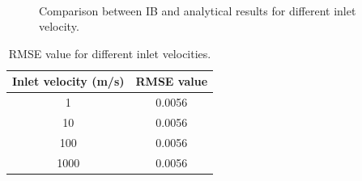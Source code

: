 \begin{figure}[H]
	\centering
	\quad
	\\
	\quad
	\caption{Comparison between IB and analytical results for different inlet velocity.}
	\label{fig:C3_penalizationResultInletVelocity}
\end{figure}

\begin{table}[H]
\centering
\begin{tabular}{c | c}
	Inlet velocity (m/s) & RMSE value \\ \hline \hline
	1 & 0.0056 \\ \hline
	10 & 0.0056 \\ \hline
	100 & 0.0056 \\ \hline
	1000 & 0.0056
\end{tabular}
\caption{RMSE value for different inlet velocities.}
\label{table:C3_penalizationResultInletVelocityRMSE}
\end{table}

